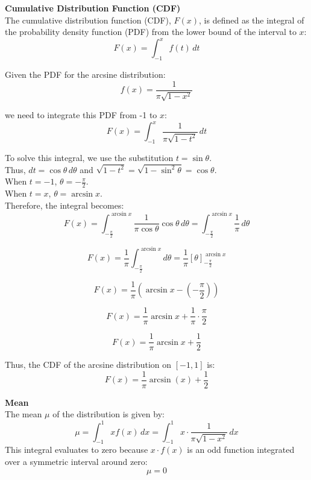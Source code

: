 \textbf{Cumulative Distribution Function (CDF)}\\
The cumulative distribution function (CDF), \( F(x) \), is defined as the integral of the probability density function (PDF) from the lower bound of the interval to \( x \):
\begin{equation}
    F(x) = \int_{-1}^{x} f(t) \, dt
\end{equation}

Given the PDF for the arcsine distribution:
\[
f(x) = \frac{1}{\pi \sqrt{1-x^2}}
\]

we need to integrate this PDF from -1 to \( x \):
\[
F(x) = \int_{-1}^{x} \frac{1}{\pi \sqrt{1-t^2}} \, dt
\]

To solve this integral, we use the substitution \( t = \sin \theta \).\\
Thus, \( dt = \cos \theta \, d\theta \) and \( \sqrt{1-t^2} = \sqrt{1-\sin^2 \theta} = \cos \theta \).\\
When \( t = -1 \), \( \theta = -\frac{\pi}{2} \).\\
When \( t = x \), \( \theta = \arcsin x \).\\
Therefore, the integral becomes:
\[
F(x) = \int_{-\frac{\pi}{2}}^{\arcsin x} \frac{1}{\pi \cos \theta} \cos \theta \, d\theta = \int_{-\frac{\pi}{2}}^{\arcsin x} \frac{1}{\pi} \, d\theta
\]

\[
F(x) = \frac{1}{\pi} \int_{-\frac{\pi}{2}}^{\arcsin x} d\theta = \frac{1}{\pi} \left[ \theta \right]_{-\frac{\pi}{2}}^{\arcsin x}
\]

\[
F(x) = \frac{1}{\pi} \left( \arcsin x - \left( -\frac{\pi}{2} \right) \right)
\]

\[
F(x) = \frac{1}{\pi} \arcsin x + \frac{1}{\pi} \cdot \frac{\pi}{2}
\]

\[
F(x) = \frac{1}{\pi} \arcsin x + \frac{1}{2}
\]

Thus, the CDF of the arcsine distribution on \([-1, 1]\) is:
\begin{equation}
    F(x) = \frac{1}{\pi} \arcsin(x) + \frac{1}{2}
\end{equation}

\textbf{Mean}\\
The mean \(\mu\) of the distribution is given by:
\begin{equation}
    \mu = \int_{-1}^{1} x f(x) \, dx = \int_{-1}^{1} x \cdot \frac{1}{\pi \sqrt{1-x^2}} \, dx
\end{equation}
This integral evaluates to zero because \( x \cdot f(x) \) is an odd function integrated over a symmetric interval around zero:
\begin{equation}
    \mu = 0
\end{equation}

